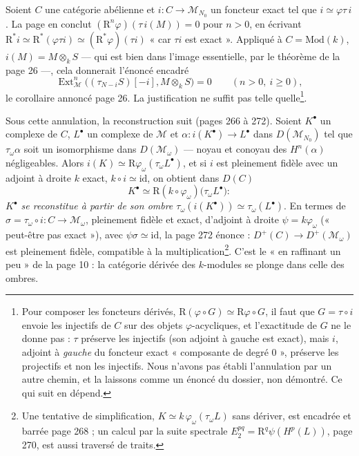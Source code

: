 \documentclass[11pt,a4paper]{article}
\begin{document}
Soient $C$ une catégorie abélienne et $i : C \to \mathcal{M}_{N_0}$ un foncteur
exact tel que $i \simeq \varphi\tau\, i$. La page en conclut
$(\mathrm{R}^n\varphi)(\tau\, i(M)) = 0$ pour $n > 0$, en écrivant $\mathrm{R}^*i
\simeq \mathrm{R}^*(\varphi\tau i) \simeq (\mathrm{R}^*\varphi)(\tau i)$ « car
$\tau i$ est exact ». Appliqué à $C = \mathrm{Mod}(k)$, $i(M) = M \otimes_k S$ —
qui est bien dans l'image essentielle, par le théorème de la page 26 —, cela
donnerait l'énoncé encadré
\[
\operatorname{Ext}^n_{\mathcal{M}}\bigl((\tau_{N-i}S)[-i], M \otimes_k S\bigr) = 0 \qquad (n > 0,\ i \geq 0) ,
\]
le corollaire annoncé page 26. La justification ne suffit pas telle
quelle\footnote{Pour composer les foncteurs dérivés, $\mathrm{R}(\varphi \circ
G) \simeq \mathrm{R}\varphi \circ G$, il faut que $G = \tau \circ i$ envoie les
injectifs de $C$ sur des objets $\varphi$-acycliques, et l'exactitude de $G$ ne
le donne pas : $\tau$ préserve les injectifs (son adjoint à gauche est exact),
mais $i$, adjoint à \emph{gauche} du foncteur exact « composante de degré $0$ »,
préserve les projectifs et non les injectifs. Nous n'avons pas établi
l'annulation par un autre chemin, et la laissons comme un énoncé du dossier,
non démontré. Ce qui suit en dépend.}.

Sous cette annulation, la reconstruction suit (pages 266 à 272). Soient $K^\bullet$
un complexe de $C$, $L^\bullet$ un complexe de $\mathcal{M}$ et $\alpha :
i(K^\bullet) \to L^\bullet$ dans $D(\mathcal{M}_{N_0})$ tel que
$\tau_\omega\alpha$ soit un isomorphisme dans $D(\mathcal{M}_\omega)$ — noyau et
conoyau des $H^n(\alpha)$ négligeables. Alors $i(K) \simeq
\mathrm{R}\varphi_\omega(\tau_\omega L^\bullet)$, et si $i$ est pleinement fidèle
avec un adjoint à droite $k$ exact, $k \circ i \simeq \mathrm{id}$, on obtient
dans $D(C)$
\[
K^\bullet \simeq \mathrm{R}(k \circ \varphi_\omega)\bigl(\tau_\omega L^\bullet\bigr) :
\]
\emph{$K^\bullet$ se reconstitue à partir de son ombre $\tau_\omega(i(K^\bullet))
\simeq \tau_\omega(L^\bullet)$}. En termes de $\sigma = \tau_\omega \circ i : C \to
\mathcal{M}_\omega$, pleinement fidèle et exact, d'adjoint à droite $\psi =
k\varphi_\omega$ (« peut-être pas exact »), avec $\psi\sigma \simeq
\mathrm{id}$, la page 272 énonce : $D^+(C) \to D^+(\mathcal{M}_\omega)$ est
pleinement fidèle, compatible à la multiplication\footnote{Une tentative de
simplification, $K \simeq k\,\varphi_\omega(\tau_\omega L)$ sans dériver, est
encadrée et barrée page 268 ; un calcul par la suite spectrale $E_2^{pq} =
\mathrm{R}^q\psi(H^p(L))$, page 270, est aussi traversé de traits.}. C'est le
« en raffinant un peu » de la page 10 : la catégorie dérivée des $k$-modules se
plonge dans celle des ombres.
\end{document}
